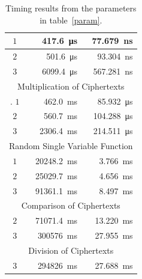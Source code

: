 \documentclass{article}
\begin{document}
\begin{table}[h]
\begin{center}
\begin{tabular}{| c | r | r |}
                \\ \hline
                $1$ & \SI{417.6}{\micro\second} & \SI{77.679}{\nano\second}
                \\ \hline
                $2$ & \SI{501.6}{\micro\second} & \SI{93.304}{\nano\second}
                \\ \hline
                $3$ & \SI{6099.4}{\micro\second} & \SI{567.281}{\nano\second}
                \\ \hline
                \multicolumn{3}{|c|}{Multiplication of Ciphertexts}
                \\ \hline.
                $1$ & \SI{462.0}{\milli\second} & \SI{85.932}{\micro\second}
                \\ \hline
                $2$ & \SI{560.7}{\milli\second} & \SI{104.288}{\micro\second}
                \\ \hline
                $3$ & \SI{2306.4}{\milli\second} & \SI{214.511}{\micro\second}
                \\ \hline
                \multicolumn{3}{|c|}{Random Single Variable Function}
                \\ \hline
                $1$ & \SI{20248.2}{\milli\second} & \SI{3.766}{\milli\second}
                \\ \hline
                $2$ & \SI{25029.7}{\milli\second} & \SI{4.656}{\milli\second}
                \\ \hline
                $3$ & \SI{91361.1}{\milli\second} & \SI{8.497}{\milli\second}
                \\ \hline
                \multicolumn{3}{|c|}{Comparison of Ciphertexts}
                \\ \hline
                $2$ & \SI{71071.4}{\milli\second} & \SI{13.220}{\milli\second}
                \\ \hline
                $3$ & \SI{300576}{\milli\second} & \SI{27.955}{\milli\second}
                \\ \hline
                \multicolumn{3}{|c|}{Division of Ciphertexts}
                \\ \hline
                $3$ & \SI{294826}{\milli\second} & \SI{27.688}{\milli\second}
                \\ \hline
            \end{tabular}
        \end{center}
        \label{results}
        \caption{Timing results from the parameters in table~\ref{param}.}
      \end{table}
\end{document}
